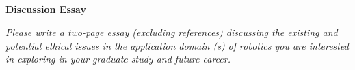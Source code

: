 \documentclass[12pt]{article}
\title{
    \vspace{2in}
    \textmd{\textbf{\hmwkClass\ \hmwkTitle}}\\
    \vspace{3in}
}
\author{\hmwkAuthorName}
\date{}
\begin{document}
\maketitle

\pagebreak

\begin{center}
    \large\textbf{Discussion Essay}
\end{center}

\textit{Please write a two-page essay (excluding references) discussing the existing and potential 
ethical issues in the application domain (s) of robotics you are interested in exploring in your 
graduate study and future career.}\\
\vspace{0in}\\
\lipsum[1]\\
\vspace{0in}\\
\lipsum[2]\\
\vspace{0in}\\
\lipsum[3]\\
\vspace{0in}\\
\lipsum[4]\\
\vspace{0in}\\
\lipsum[5]\\
\vspace{0in}\\
\lipsum[6]\\
\vspace{0in}\\
\lipsum[7]\\
\vspace{0in}\\
\lipsum[8]\\
\vspace{0in}\\
\lipsum[9]\\
\vspace{0in}\\
\lipsum[10]
\end{document}
